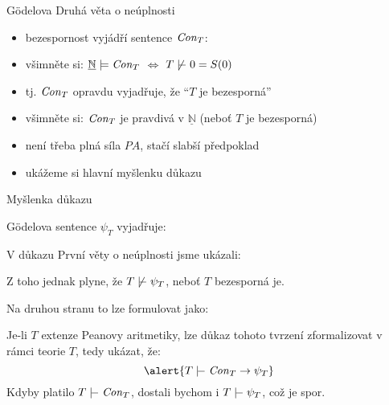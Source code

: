 \documentclass{beamer}
\begin{document}
\begin{frame}{Gödelova Druhá věta o neúplnosti}
    

    \begin{itemize}
        \item bezespornost vyjádří sentence \alert{$\mathit{Con}_T$}:\hfill {}  
        \item všimněte si: $\underline{\mathbb N}\models\mathit{Con}_T$ $\Leftrightarrow$ $T\not\proves 0=S(0)$
        \item tj. $\mathit{Con}_T$ opravdu vyjadřuje, že \alert{``$T$ je bezesporná''}
    \end{itemize}

    \bigskip
    

    \medskip

    \begin{itemize}
        \item všimněte si: \alert{$\mathit{Con}_T$ je pravdivá v $\underline{\mathbb N}$} (neboť $T$ je bezesporná)
        \item není třeba plná síla $PA$, stačí slabší předpoklad
        \item ukážeme si hlavní myšlenku důkazu
    \end{itemize}
    
\end{frame}


\begin{frame}{Myšlenka důkazu}

    Gödelova sentence $\psi_T$ vyjadřuje: 
    
    V důkazu První věty o neúplnosti jsme ukázali:

    
    Z toho jednak plyne, že $T\not\proves\psi_T$, neboť $T$ bezesporná je. 
    
    Na druhou stranu to lze formulovat jako: 
    
    Je-li $T$ extenze Peanovy aritmetiky, lze důkaz tohoto tvrzení zformalizovat v rámci teorie $T$, tedy ukázat, že:
    $$
    \alert{ T\proves\Con_T\to\psi_T}
    $$
    Kdyby platilo $T\proves\Con_T$, dostali bychom i $T\proves\psi_T$, což je spor.
    \hfill\qedsymbol

\end{frame}
\end{document}
